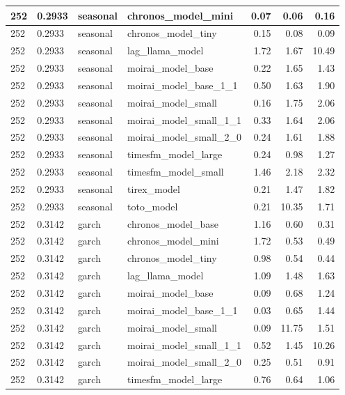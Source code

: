 {\begin{tabular}{llllrrr}
\midrule
252 & 0.2933 & seasonal & chronos\_model\_mini & 0.07 & 0.06 & 0.16 \\
\midrule
252 & 0.2933 & seasonal & chronos\_model\_tiny & 0.15 & 0.08 & 0.09 \\
\midrule
252 & 0.2933 & seasonal & lag\_llama\_model & 1.72 & 1.67 & 10.49 \\
\midrule
252 & 0.2933 & seasonal & moirai\_model\_base & 0.22 & 1.65 & 1.43 \\
\midrule
252 & 0.2933 & seasonal & moirai\_model\_base\_1\_1 & 0.50 & 1.63 & 1.90 \\
\midrule
252 & 0.2933 & seasonal & moirai\_model\_small & 0.16 & 1.75 & 2.06 \\
\midrule
252 & 0.2933 & seasonal & moirai\_model\_small\_1\_1 & 0.33 & 1.64 & 2.06 \\
\midrule
252 & 0.2933 & seasonal & moirai\_model\_small\_2\_0 & 0.24 & 1.61 & 1.88 \\
\midrule
252 & 0.2933 & seasonal & timesfm\_model\_large & 0.24 & 0.98 & 1.27 \\
\midrule
252 & 0.2933 & seasonal & timesfm\_model\_small & 1.46 & 2.18 & 2.32 \\
\midrule
252 & 0.2933 & seasonal & tirex\_model & 0.21 & 1.47 & 1.82 \\
\midrule
252 & 0.2933 & seasonal & toto\_model & 0.21 & 10.35 & 1.71 \\
\midrule
252 & 0.3142 & garch & chronos\_model\_base & 1.16 & 0.60 & 0.31 \\
\midrule
252 & 0.3142 & garch & chronos\_model\_mini & 1.72 & 0.53 & 0.49 \\
\midrule
252 & 0.3142 & garch & chronos\_model\_tiny & 0.98 & 0.54 & 0.44 \\
\midrule
252 & 0.3142 & garch & lag\_llama\_model & 1.09 & 1.48 & 1.63 \\
\midrule
252 & 0.3142 & garch & moirai\_model\_base & 0.09 & 0.68 & 1.24 \\
\midrule
252 & 0.3142 & garch & moirai\_model\_base\_1\_1 & 0.03 & 0.65 & 1.44 \\
\midrule
252 & 0.3142 & garch & moirai\_model\_small & 0.09 & 11.75 & 1.51 \\
\midrule
252 & 0.3142 & garch & moirai\_model\_small\_1\_1 & 0.52 & 1.45 & 10.26 \\
\midrule
252 & 0.3142 & garch & moirai\_model\_small\_2\_0 & 0.25 & 0.51 & 0.91 \\
\midrule
252 & 0.3142 & garch & timesfm\_model\_large & 0.76 & 0.64 & 1.06 \\

\end{tabular}}
